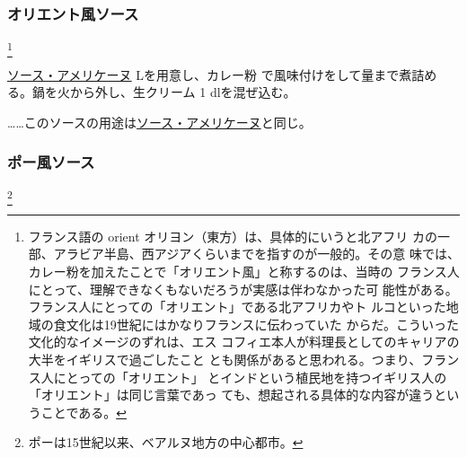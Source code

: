 \begin{recette}
\maeaki

\hypertarget{sauce-orientale}{%
\subsubsection{オリエント風ソース}\label{sauce-orientale}}

\footnote{フランス語の orient
  オリヨン（東方）は、具体的にいうと北アフリ
  カの一部、アラビア半島、西アジアくらいまでを指すのが一般的。その意
  味では、カレー粉を加えたことで「オリエント風」と称するのは、当時の
  フランス人にとって、理解できなくもないだろうが実感は伴わなかった可
  能性がある。フランス人にとっての「オリエント」である北アフリカやト
  ルコといった地域の食文化は19世紀にはかなりフランスに伝わっていた
  からだ。こういった文化的なイメージのずれは、エス
  コフィエ本人が料理長としてのキャリアの大半をイギリスで過ごしたこと
  とも関係があると思われる。つまり、フランス人にとっての「オリエント」
  とインドという植民地を持つイギリス人の「オリエント」は同じ言葉であっ
  ても、想起される具体的な内容が違うということである。}


\protect\hyperlink{sauce-americaine}{ソース・アメリケーヌ}\undemi{}
Lを用意し、カレー粉
で風味付けをして\deuxtiers{}量まで煮詰める。鍋を火から外し、生クリーム
1\undemi{} dlを混ぜ込む。

\ldots{}\ldots{}このソースの用途は\protect\hyperlink{sauce-americaine}{ソース・アメリケーヌ}と同じ。

\maeaki

\hypertarget{sauce-paloise}{%
\subsubsection{ポー風ソース}\label{sauce-paloise}}

\footnote{ポーは15世紀以来、ベアルヌ地方の中心都市。}



\end{recette}

